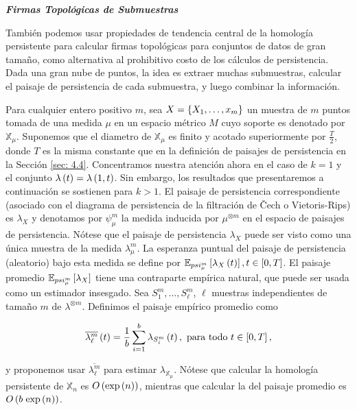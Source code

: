 \textbf{\textit{\large Firmas Topol\'ogicas de Submuestras}}

Tambi\'en podemos usar propiedades de tendencia central de la homolog\'ia persistente para
calcular firmas topol\'ogicas para conjuntos de datos de gran tama\~{n}o,
como alternativa al prohibitivo costo de los c\'alculos de persistencia.
Dada una gran nube de puntos, la idea es extraer muchas submuestras,
calcular el paisaje de persistencia de cada submuestra, y luego combinar la informaci\'on.

Para cualquier entero positivo $m$, sea $X = \left\{X_{1},\dots,x_{m}\right\}$ un muestra de $m$ puntos
tomada de una medida $\mu$ en un espacio m\'etrico $M$
cuyo soporte es denotado por $\mathbb{X}_{\mu}$.
Suponemos que el diametro de $\mathbb{X}_{\mu}$ es finito
y acotado superiormente por $\frac{T}{2}$,
donde $T$ es la misma constante que en la definici\'on de paisajes de persistencia
en la Secci\'on \ref{sec: 4.4}.
Concentramos nuestra atenci\'on ahora en el caso de $k=1$ y el conjunto
$\lambda\left(t\right)=\lambda\left(1,t\right)$.
Sin embargo, los resultados que presentaremos a continuaci\'on se sostienen para $k>1$.
El paisaje de persistencia correspondiente (asociado con el diagrama de persistencia
de la filtraci\'on de \v Cech o Vietoris-Rips) es $\lambda_{X}$
y denotamos por $\psi_{\mu}^{m}$ la medida inducida por $\mu^{\otimes m}$
en el espacio de paisajes de persistencia.
N\'otese que el paisaje de persistencia $\lambda_{X}$ puede ser visto como
una \'unica muestra de la medida $\lambda_{\mu}^{m}$.
La esperanza puntual del paisaje de persistencia (aleatorio) bajo esta medida
se define por $\mathbb{E}_{psi_{\mu}^{m}}\left[\lambda_{X}\left(t\right)\right], t\in\left[0,T\right]$.
El paisaje promedio $\mathbb{E}_{psi_{\mu}^{m}}\left[\lambda_{X}\right]$
tiene una contraparte emp\'irica natural, que puede ser usada como un estimador insesgado.
Sea $S_{1}^{m},\dots,S_{\ell}^{m}$, $\ell$ muestras independientes de
tama\~{n}o $m$ de $\lambda^{\otimes m}$. Definimos el paisaje emp\'irico promedio como

\begin{equation}
    \overline{\lambda_{\ell}^{m}}\left(t\right)=
    \frac{1}{b}\sum_{i=1}^{b}\lambda_{S_{i}^{m}}\left(t\right),\text{ para todo }t\in\left[0,T\right],
\end{equation}

y proponemos usar $\overline{\lambda_{\ell}^{m}}$ para estimar $\lambda_{\mathbb{X}_{\mu}}$.
N\'otese que calcular la homolog\'ia persistente de $\mathbb{X}_{n}$ es
$O\left(\mathrm{exp}\left(n\right)\right)$,
mientras que calcular la del paisaje promedio es $O\left(b\hspace{3pt}\mathrm{exp}\left(n\right)\right)$.

